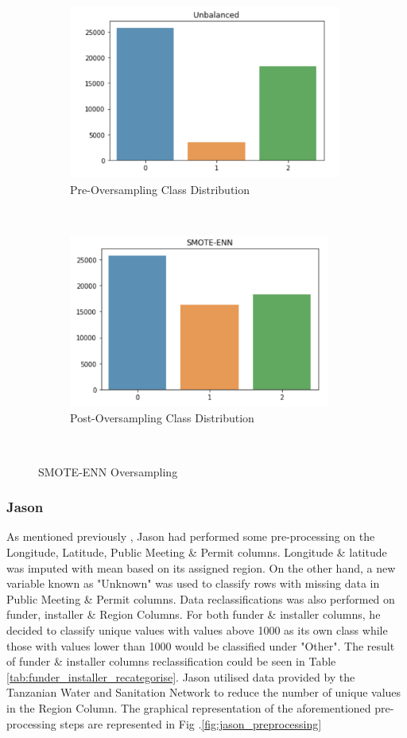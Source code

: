 \documentclass[conference]{IEEEtran}
\begin{document}
\begin{figure}[t!]
  \centering
  \begin{subfigure}[t]{0.5\textwidth}
      \centering
      \includegraphics[height=2.25in]{figures/tom_smote_1}
      \caption{Pre-Oversampling Class Distribution}
  \end{subfigure}%
  ~
  \begin{subfigure}[t]{0.5\textwidth}
      \centering
      \includegraphics[height=2.25in]{figures/tom_smote_2}
      \caption{Post-Oversampling Class Distribution}
  \end{subfigure}
  ~
  \caption{SMOTE-ENN Oversampling}
  \label{fig:smote}
\end{figure}

\subsubsection{Jason}

As mentioned previously , Jason had performed some pre-processing on the Longitude, Latitude, Public Meeting \& Permit columns. Longitude \& latitude was imputed with mean based on its assigned region. On the other hand, a new variable known as "Unknown" was used to classify rows with missing data in Public Meeting \& Permit columns. Data reclassifications was also performed on funder, installer \& Region Columns. For both funder \& installer columns, he decided to classify unique values with values above 1000 as its own class while those with values lower than 1000 would be classified under "Other". The result of funder \& installer columns reclassification could be seen in Table \ref{tab:funder_installer_recategorise}. Jason utilised data provided by the Tanzanian Water and Sanitation Network to reduce the number of unique values in the Region Column. The graphical representation of the aforementioned pre-processing steps are represented in Fig .\ref{fig:jason_preprocessing}
\end{document}
